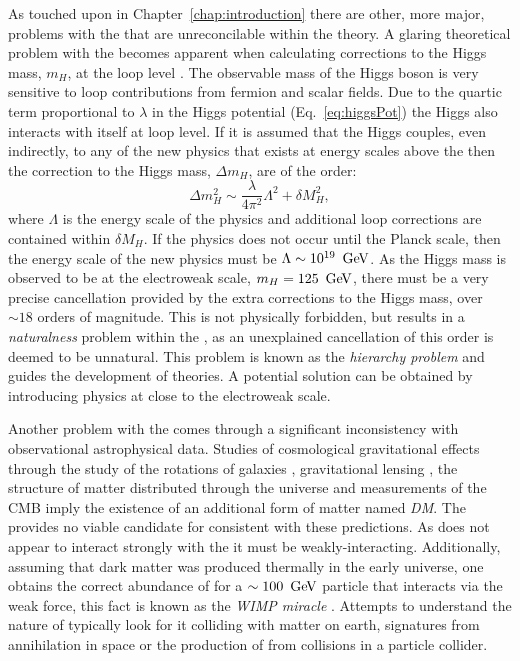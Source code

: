 As touched upon in Chapter~\ref{chap:introduction} there are other,
more major, problems with the \SM that are unreconcilable within the
theory. A glaring theoretical problem with the \SM becomes apparent
when calculating corrections to the Higgs mass, $m_H$, at the loop
level \cite{Martin:1997ns}. The observable mass of the Higgs boson is
very sensitive to loop contributions from fermion and scalar fields.
Due to the quartic term proportional to $\lambda$ in the Higgs
potential (Eq.~\ref{eq:higgsPot}) the Higgs also interacts with itself
at loop level. If it is assumed that the Higgs couples, even indirectly, to
any of the new physics that exists at energy scales above the \SM then the
correction to the Higgs mass, $\Delta m_H$, are of the order:
\begin{equation}
\Delta m_H^2 \sim \frac{\lambda}{4\pi^2}\Lambda^2+\delta M_H^2,
\end{equation}
where $\Lambda$ is the energy scale of the \BSM physics and additional
loop corrections are contained within $\delta M_H$. If the \BSM
physics does not occur until the Planck scale, then the energy scale
of the new physics must be $\Lambda\sim 10^{19}~\mathrm{\,Ge\kern -0.1em V}$. As the Higgs
mass is observed to be at the electroweak scale, $m_H=125~\mathrm{\,Ge\kern -0.1em V}$, there
must be a very precise cancellation provided by the extra corrections
to the Higgs mass, over $\sim18$ orders of magnitude. This is not
physically forbidden, but results in a \emph{naturalness} problem
within the \SM, as an unexplained cancellation of this order is deemed to
be unnatural. This problem is known as the \emph{hierarchy problem}
and guides the development of \BSM theories. A potential solution can
be obtained by introducing \BSM physics at close to the electroweak scale.

Another problem with the \SM comes through a significant inconsistency
with observational astrophysical data. Studies of cosmological
gravitational effects through the study of the rotations of galaxies
\cite{Kapteyn:1922zz,Oort:436532}, gravitational lensing
\cite{Markevitch:2003at}, the structure of matter distributed through
the universe \cite{2012Natur.487..202D} and measurements of the
\ac{CMB} \cite{Ade:2015xua,0067-0049-180-2-225} imply the existence of
an additional form of matter named \emph{\acf{DM}}. The \SM provides
no viable candidate for \DM consistent with these predictions. As \DM
does not appear to interact strongly with the \SM it must be
weakly-interacting. Additionally, assuming that dark matter was
produced thermally in the early universe, one obtains the correct
abundance of \DM for a $\sim 100~\mathrm{\,Ge\kern -0.1em V}$ particle that interacts via the
weak force, this fact is known as the \emph{WIMP miracle}
\cite{Jungman:1995df}. Attempts to understand the nature of \DM
typically look for it colliding with matter on earth, signatures from
\DM annihilation in space or the production of \DM from \SM collisions
in a particle collider. %

